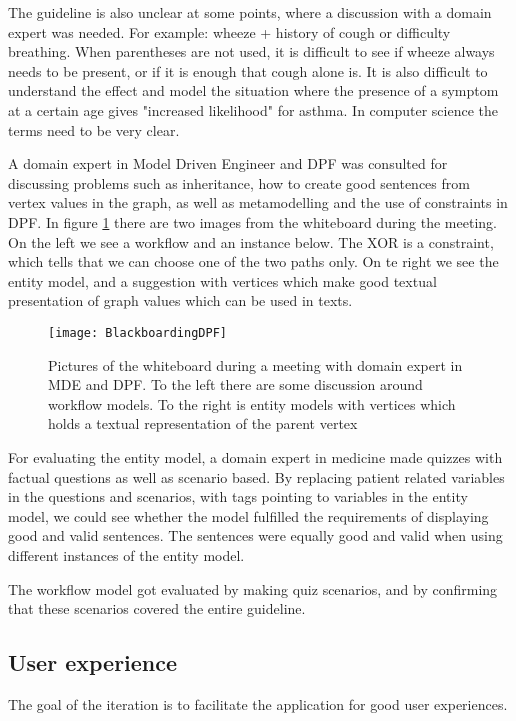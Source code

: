 The guideline is also unclear at some points, where a discussion with a domain expert was needed. For example: wheeze + history of cough or difficulty breathing. When parentheses are not used, it is difficult to see if wheeze always needs to be  present, or if it is enough that cough alone is. It is also difficult to understand the effect and model the situation where the presence of a symptom at a certain age gives "increased likelihood" for asthma. In computer science the terms need to be very clear.

A domain expert in Model Driven Engineer and DPF was consulted for discussing problems such as inheritance, how to create good sentences from vertex values in the graph, as well as metamodelling and the use of constraints in DPF. In figure \ref{fig:BlackboardingDPF} there are two images from the whiteboard during the meeting. On the left we see a workflow and an instance below. The XOR is a constraint, which tells that we can choose one of the two  paths only. On te right we see the entity model, and a suggestion with vertices which make good textual presentation of graph values which can be used in texts. 

\begin{figure}[h!]
	\texttt{[image: BlackboardingDPF]}
	\caption {Pictures of the whiteboard during a meeting with domain expert in MDE and DPF. To the left there are some discussion around workflow models. To the right is entity models with vertices which holds a textual representation of the parent vertex}
	\label{fig:BlackboardingDPF}
\end{figure}

For evaluating the entity model, a domain expert in medicine made quizzes with factual questions as well as scenario based. By replacing patient related variables in the questions and scenarios, with tags pointing to variables in the entity model, we could see whether the model fulfilled the requirements of displaying good and valid sentences. The sentences were equally good and valid when using different instances of the entity model.

The workflow model got evaluated by making quiz scenarios, and by confirming that these scenarios covered the entire guideline.



 
\subsection{User experience}
The goal of the iteration is to facilitate the application for good user experiences.

